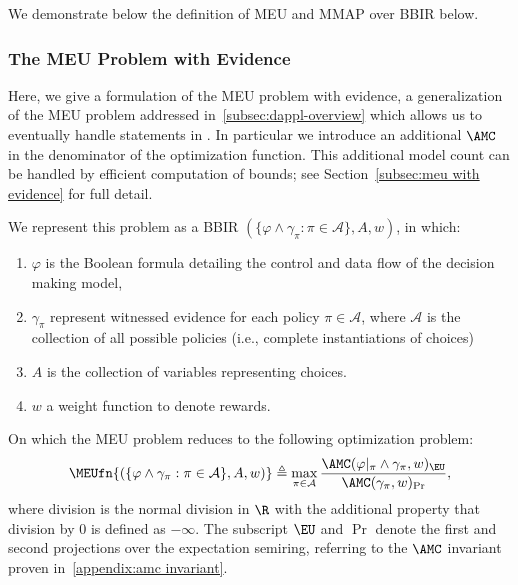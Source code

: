 
We demonstrate below the definition of MEU and MMAP over BBIR below.

\subsubsection{The MEU Problem with Evidence}\label{subsubsec:meu}

Here, we give a formulation of the
MEU problem with evidence, a generalization of the MEU problem
addressed in~\cref{subsec:dappl-overview}
which allows us to eventually handle
 statements in \dappl{}.
In particular we introduce an additional $\AMC$
in the denominator of the optimization function.
This additional model count can be handled by efficient
computation of bounds;
see Section~\ref{subsec:meu with evidence}
for full detail.

We represent this problem as a BBIR
$(\{\varphi \land \gamma_{\pi} : \pi \in \mathcal A\}, A, w)$, in which:

\begin{enumerate}[leftmargin=*]
  \item $\varphi$ is the Boolean formula detailing the control and data flow
  of the decision making model,
  \item $\gamma_{\pi}$ represent witnessed evidence for
  each policy $\pi \in \mathcal A$, where $\mathcal A$ is the collection of
  all possible policies (i.e., complete instantiations of choices)
  \item $A$ is the collection of variables representing choices.
  \item $w$ a weight function to denote rewards.
\end{enumerate}
On which the MEU problem reduces to the following optimization problem:
{\footnotesize\begin{equation}\label{eq:bbir-meu}
  \MEUfn{(\{\varphi \land \gamma_{\pi} : \pi \in \mathcal A\}, A, w)}
    \triangleq \max_{\pi \in \mathcal A} \frac{\AMC(\varphi|_{\pi} \land \gamma_{\pi},w)_{\EU}}{\AMC(\gamma_{\pi}, w)_{\Pr}},
\end{equation}}
where division is the normal division in $\R$  with the additional property that
division by $0$ is defined as $-\infty$.
The subscript $\EU$ and $\Pr$ denote the first and second projections over the expectation semiring,
referring to the $\AMC$ invariant proven in~\cref{appendix:amc invariant}.

